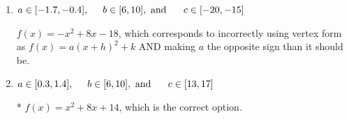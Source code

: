 \documentclass{extbook}[14pt]
\begin{document}
\begin{enumerate}
{\begin{enumerate}[label=\Alph*.]
$f(x)=-x^{2} -8 x -18$, which corresponds to making $a$ the opposite sign than it should be.
\item \( a \in [-1.7, -0.4], \hspace*{5mm} b \in [6, 10], \text{ and } \hspace*{5mm} c \in [-20, -15] \)

$f(x)=-x^{2} +8 x -18$, which corresponds to incorrectly using vertex form as $f(x) = a(x+h)^2+k$ AND making $a$ the opposite sign than it should be.
\item \( a \in [0.3, 1.4], \hspace*{5mm} b \in [6, 10], \text{ and } \hspace*{5mm} c \in [13, 17] \)

* $f(x)=x^{2} +8 x + 14$, which is the correct option.
\end{enumerate}

}
\end{enumerate}
\end{document}
